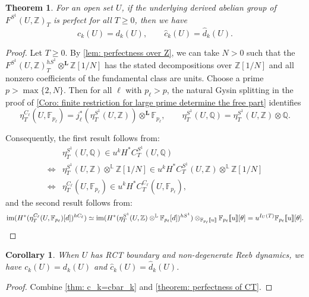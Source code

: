 \documentclass[11pt]{amsart}
\numberwithin{equation}{section}
\theoremstyle{plain}
\newtheorem{Thm}{Theorem}[section]
\newtheorem{Coro}[coro]{Corollary}
\theoremstyle{definition}
\theoremstyle{remark}
\newcommand{\bF} { {\mathbb{F}}}
\newcommand{\bQ} { {\mathbb{Q}}}
\newcommand{\bZ} { {\mathbb{Z}}}
\newcommand{\fpw}[1]{{\llbracket #1\rrbracket}}
\newcommand\im{ {\operatorname{im}} }
\begin{document}
\begin{Thm}\label{thm: c_k=cbar_k}For an open set $U$, if the underlying derived abelian group of $F^{S^1}(U,\bZ)_{T} $ is perfect  for all $T\geq 0$, then we have
\[c_k(U)=d_k(U),\qquad \widehat c_k(U)=\widehat d_k(U).\]
\end{Thm}

\begin{proof}Let $T\geq 0$. By \autoref{lem: perfectness over Z}, we can take $N>0$ such that the $F^{S^1}(U,\bZ)_{T}^{hS^1}\otimes^{\mathbf L} \bZ[1/N]$ has
the stated decompositions over $\bZ[1/N]$ and all nonzero coefficients of the fundamental
class are units. Choose a prime $p>\max\{2,N\}$. Then for all $\ell$ with $p_\ell >p$,  the natural Gysin splitting in the proof of \autoref{Coro: finite restriction for large prime determine the free part} identifies
\begin{equation}\label{eq: finite field reduction-fundamental class}
    \eta^{C_\ell}_T(U,\bF_{p_\ell})=j_\ell^*(\eta^{S^1}_T(U,\bZ))\otimes^{\mathbf L} \bF_{p_\ell},\qquad \eta^{S^1}_T(U,\bQ)=\eta^{S^1}_T(U,\bZ)\otimes {\bQ}.
\end{equation} 

Consequently, the first result follows from:
\begin{align*}
    &\eta^{S^1}_T(U,\bQ) \in u^kH^*C_T^{S^1}(U,\bQ)\\
    \iff  &\eta^{S^1}_T(U,\bZ) \otimes^{\mathbb{L}} \bZ[1/N]\in u^kH^*C_T^{S^1}(U,\bZ) \otimes^{\mathbb{L}} \bZ[1/N]\\
     \iff  &\eta^{C_\ell}_T(U,\bF_{p_\ell}) \in u^kH^*C_T^{C_\ell}(U,\bF_{p_\ell}),
\end{align*}
and the second result follows from:
\[\im(H^*(\eta^{C_\ell}_T(U,\bF_{p_\ell})[d])^{hC_\ell}) \simeq \im(H^*(\eta^{S^1}_T(U,\bZ)\otimes^{\mathbb{L}}{\bF_{p_\ell}}[d])^{hS^1}) \otimes_{\bF_{p_\ell}\fpw{u}}\bF_{p_\ell}\fpw{u}[\theta]=u^{I_U(T)}\bF_{p_\ell}\fpw{u}[\theta].  \qedhere\]
\end{proof}








\begin{Coro}When $U$ has RCT boundary and non-degenerate Reeb dynamics, we have $c_k(U)=d_k(U)$ and  $\widehat c_k(U)=\widehat d_k(U)$.    
\end{Coro}
\begin{proof}Combine \autoref{thm: c_k=cbar_k} and \autoref{theorem: perfectness of CT}.    
\end{proof}
\end{document}
